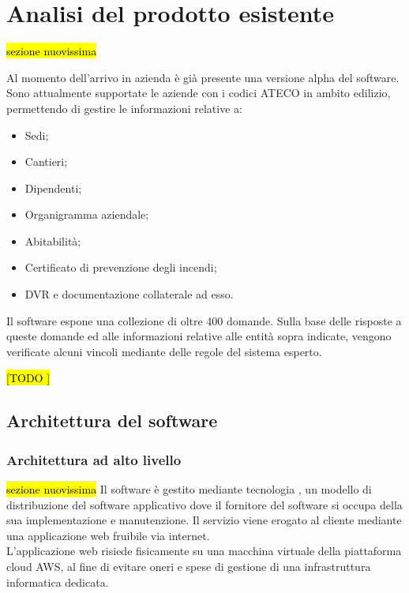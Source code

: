 
\section{Analisi del prodotto esistente}
\hl{sezione nuovissima}

Al momento dell'arrivo in azienda è già presente una versione alpha del software. \\
Sono attualmente supportate le aziende con i codici \gls{ATECO} in ambito edilizio, permettendo di gestire le informazioni relative a:
\begin{itemize}
	\item Sedi;
	\item Cantieri;
	\item Dipendenti;
	\item Organigramma aziendale;
	\item Abitabilità;
	\item Certificato di prevenzione degli incendi;
	\item \gls{DVR} e documentazione collaterale ad esso.
\end{itemize}
Il software espone una collezione di oltre 400 domande. Sulla base delle risposte a queste domande ed alle informazioni relative alle entità sopra indicate, vengono verificate alcuni vincoli mediante delle regole del sistema esperto.


\hl{[TODO ]}

\subsection{Architettura del software}
\subsubsection{Architettura ad alto livello}
\hl{sezione nuovissima}
Il software è gestito mediante tecnologia , un modello di distribuzione del software applicativo dove il fornitore del software si occupa della sua implementazione e manutenzione. Il servizio viene erogato al cliente mediante una applicazione web fruibile via internet. \\ 
L'applicazione web risiede fisicamente su una macchina virtuale della piattaforma cloud \gls{AWS}, al fine di evitare oneri e spese di gestione di una infrastruttura informatica dedicata.\\


